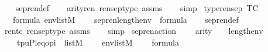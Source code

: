 \begin{isabellebody}
%
\isadelimproof
\ \ %
\endisadelimproof
%
\isatagproof
{}\isamarkupfalse%
\ sep{\isacharunderscore}{\kern0pt}ren{\isacharunderscore}{\kern0pt}def\isanewline
\ \ \isamarkupfalse%
\ arity{\isacharunderscore}{\kern0pt}ren\ rensep{\isacharunderscore}{\kern0pt}type\ assms\isanewline
\ \ \isamarkupfalse%
\ simp%
\endisatagproof
{\isafoldproof}%
%
\isadelimproof
\isanewline
%
\endisadelimproof
\isanewline
{}\isamarkupfalse%
\ type{\isacharunderscore}{\kern0pt}rensep\ {\isacharbrackleft}{\kern0pt}TC{\isacharbrackright}{\kern0pt}{\isacharcolon}{\kern0pt}\ \isanewline
\ \ \ {\isachardoublequoteopen}{\isasymphi}{\isasymin}formula{\isachardoublequoteclose}\ {\isachardoublequoteopen}env{\isasymin}list{\isacharparenleft}{\kern0pt}M{\isacharparenright}{\kern0pt}{\isachardoublequoteclose}\ \isanewline
\ \ \ {\isachardoublequoteopen}sep{\isacharunderscore}{\kern0pt}ren{\isacharparenleft}{\kern0pt}length{\isacharparenleft}{\kern0pt}env{\isacharparenright}{\kern0pt}{\isacharcomma}{\kern0pt}{\isasymphi}{\isacharparenright}{\kern0pt}\ {\isasymin}\ formula{\isachardoublequoteclose}\isanewline
%
\isadelimproof
\ \ %
\endisadelimproof
%
\isatagproof
{}\isamarkupfalse%
\ sep{\isacharunderscore}{\kern0pt}ren{\isacharunderscore}{\kern0pt}def\isanewline
\ \ \isamarkupfalse%
\ ren{\isacharunderscore}{\kern0pt}tc\ rensep{\isacharunderscore}{\kern0pt}type\ assms\isanewline
\ \ \isamarkupfalse%
\ simp%
\endisatagproof
{\isafoldproof}%
%
\isadelimproof
\isanewline
%
\endisadelimproof
\isanewline
{}\isamarkupfalse%
\ sepren{\isacharunderscore}{\kern0pt}action{\isacharcolon}{\kern0pt}\ \isanewline
\ \ \ {\isachardoublequoteopen}arity{\isacharparenleft}{\kern0pt}{\isasymphi}{\isacharparenright}{\kern0pt}\ {\isasymle}\ {}\ {\isacharhash}{\kern0pt}{\isacharplus}{\kern0pt}\ length{\isacharparenleft}{\kern0pt}env{\isacharparenright}{\kern0pt}{\isachardoublequoteclose}\isanewline
\ \ \ \ {\isachardoublequoteopen}{\isacharbrackleft}{\kern0pt}t{\isacharcomma}{\kern0pt}p{\isacharcomma}{\kern0pt}u{\isacharcomma}{\kern0pt}P{\isacharcomma}{\kern0pt}leq{\isacharcomma}{\kern0pt}o{\isacharcomma}{\kern0pt}pi{\isacharbrackright}{\kern0pt}\ {\isasymin}\ list{\isacharparenleft}{\kern0pt}M{\isacharparenright}{\kern0pt}{\isachardoublequoteclose}\isanewline
\ \ \ \ {\isachardoublequoteopen}env{\isasymin}list{\isacharparenleft}{\kern0pt}M{\isacharparenright}{\kern0pt}{\isachardoublequoteclose}\isanewline
\ \ \ \ {\isachardoublequoteopen}{\isasymphi}{\isasymin}formula{\isachardoublequoteclose}\isanewline

\end{isabellebody}
